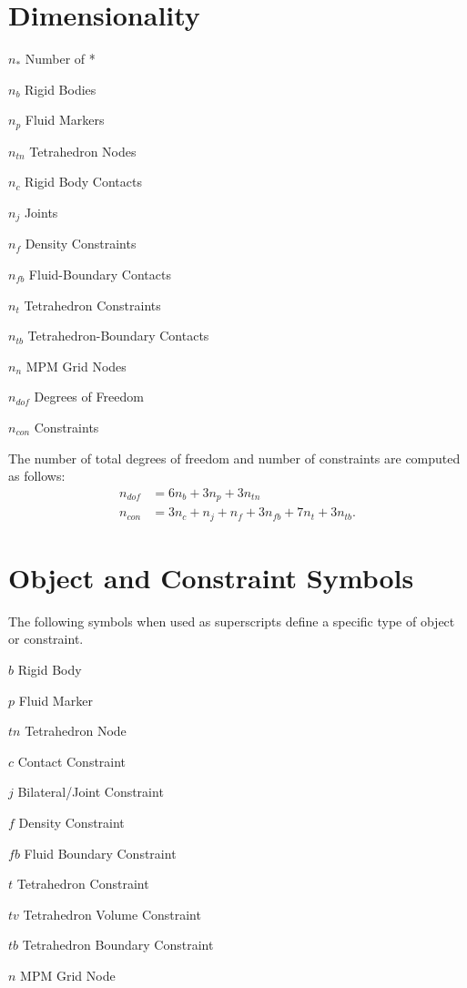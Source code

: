 \section*{Dimensionality}
\begin{multicols}{2}
\begin{compactdesc}
    \item[$n_*$] Number of *
    \item[$n_b$] Rigid Bodies
    \item[$n_p$] Fluid Markers
    \item[$n_{tn}$] Tetrahedron Nodes
    \item[$n_c$] Rigid Body Contacts
    \item[$n_j$] Joints
    \item[$n_{f}$] Density Constraints
    \item[$n_{fb}$] Fluid-Boundary Contacts
    \item[$n_{t}$] Tetrahedron Constraints
    \item[$n_{tb}$] Tetrahedron-Boundary Contacts
    \item[$n_{n}$] MPM Grid Nodes
    \item[$n_{dof}$] Degrees of Freedom
    \item[$n_{con}$] Constraints
\end{compactdesc}
\end{multicols}

The number of total degrees of freedom and number of constraints are computed as follows:
\begin{align}
n_{dof}&=6n_b + 3n_p + 3n_{tn}\\
n_{con}&=3n_c + n_j + n_f + 3n_{fb} + 7n_{t} + 3n_{tb}.
\end{align}


\section*{Object and Constraint Symbols}
The following symbols when used as superscripts define a specific type of object or constraint.
\begin{compactdesc}
    \item[$b$] Rigid Body
    \item[$p$] Fluid Marker
    \item[$tn$] Tetrahedron Node
    \item[$c$] Contact Constraint
    \item[$j$] Bilateral/Joint  Constraint
    \item[$f$] Density Constraint
    \item[$fb$] Fluid Boundary Constraint
    \item[$t$] Tetrahedron Constraint
    \item[$tv$] Tetrahedron Volume Constraint
    \item[$tb$] Tetrahedron Boundary Constraint
    \item[$n$] MPM Grid Node
\end{compactdesc}

